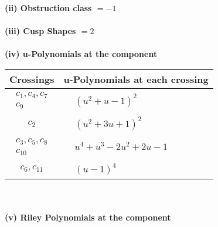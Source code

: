 \documentclass[1p]{elsarticle_modified}
\theoremstyle{definition}
\begin{document}
\flushleft \textbf{(ii) Obstruction class $= -1$}\\~\\
\flushleft \textbf{(iii) Cusp Shapes $= 2$}\\~\\
\newpage\renewcommand{\arraystretch}{1}
\flushleft \textbf{(iv) u-Polynomials at the component}\newline \\
\begin{tabular}{m{50pt}|m{274pt}}
Crossings & \hspace{64pt}u-Polynomials at each crossing \\
\hline $$\begin{aligned}c_{1},c_{4},c_{7}\\c_{9}\end{aligned}$$&$\begin{aligned}
&(u^2+u-1)^2
\end{aligned}$\\
\hline $$\begin{aligned}c_{2}\end{aligned}$$&$\begin{aligned}
&(u^2+3 u+1)^2
\end{aligned}$\\
\hline $$\begin{aligned}c_{3},c_{5},c_{8}\\c_{10}\end{aligned}$$&$\begin{aligned}
&u^4+u^3-2 u^2+2 u-1
\end{aligned}$\\
\hline $$\begin{aligned}c_{6},c_{11}\end{aligned}$$&$\begin{aligned}
&(u-1)^4
\end{aligned}$\\
\hline
\end{tabular}\\~\\
\newpage\renewcommand{\arraystretch}{1}
\flushleft \textbf{(v) Riley Polynomials at the component}\newline \\
\end{document}
